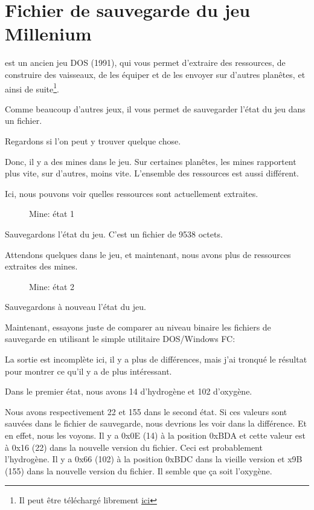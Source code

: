 ﻿\section{Fichier de sauvegarde du jeu Millenium}
\label{Millenium_DOS_game}

 est un ancien jeu DOS (1991), qui vous permet d'extraire
des ressources, de construire des vaisseaux, de les équiper et de les envoyer sur d'autres
planêtes, et ainsi de suite\footnote{Il peut être téléchargé librement \href{http://go.yurichev.com/17316}{ici}}.

Comme beaucoup d'autres jeux, il vous permet de sauvegarder l'état du jeu dans un fichier.

Regardons si l'on peut y trouver quelque chose.

\clearpage
Donc, il y a des mines dans le jeu.
Sur certaines planêtes, les mines rapportent plus vite, sur d'autres, moins vite. 
L'ensemble des ressources est aussi différent.

Ici, nous pouvons voir quelles ressources sont actuellement extraites.

\begin{figure}[H]
\centering
{}
\caption{Mine: état 1}
\label{fig:mill_1}
\end{figure}

Sauvegardons l'état du jeu.
C'est un fichier de 9538 octets.

Attendons quelques  dans le jeu, et maintenant, nous avons plus de ressources
extraites des mines.

\begin{figure}[H]
\centering
{}
\caption{Mine: état 2}
\label{fig:mill_2}
\end{figure}

Sauvegardons à nouveau l'état du jeu.

Maintenant, essayons juste de comparer au niveau binaire les fichiers de sauvegarde
en utilisant le simple utilitaire DOS/Windows FC:



La sortie est incomplète ici, il y a plus de différences, mais j'ai tronqué le résultat
pour montrer ce qu'il y a de plus intéressant.

Dans le premier état, nous avons 14  d'hydrogène et 102  d'oxygène.

Nous avons respectivement 22 et 155  dans le second état.
Si ces valeurs sont sauvées dans le fichier de sauvegarde, nous devrions les voir
dans la différence.
Et en effet, nous les voyons.
Il y a 0x0E (14) à la position 0xBDA et cette valeur est à 0x16 (22) dans la nouvelle
version du fichier.
Ceci est probablement l'hydrogène.
Il y a 0x66 (102) à la position 0xBDC dans la vieille version et x9B (155) dans la
nouvelle version du fichier.
Il semble que ça soit l'oxygène.

